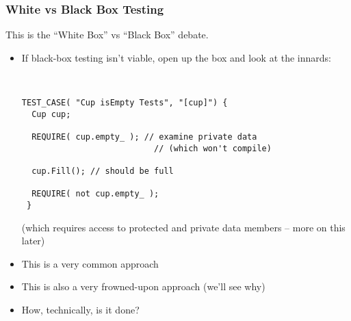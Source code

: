 \begin{frame}[fragile,t]
\frametitle{White vs Black Box Testing}
This is the ``White Box'' vs ``Black Box'' debate.
\begin{itemize}
\item If black-box testing isn't viable, open up the box and look at
  the innards:
{\scriptsize\ \begin{verbatim}
TEST_CASE( "Cup isEmpty Tests", "[cup]") {
  Cup cup;

  REQUIRE( cup.empty_ ); // examine private data
                           // (which won't compile)

  cup.Fill(); // should be full

  REQUIRE( not cup.empty_ );
 }    
\end{verbatim}}
(which requires access to protected and private data members -- more
  on this later)
\item This is a very common approach
\item This is also a very frowned-upon approach (we'll see why)
\item How, technically, is it done?
\end{itemize}


\end{frame}

